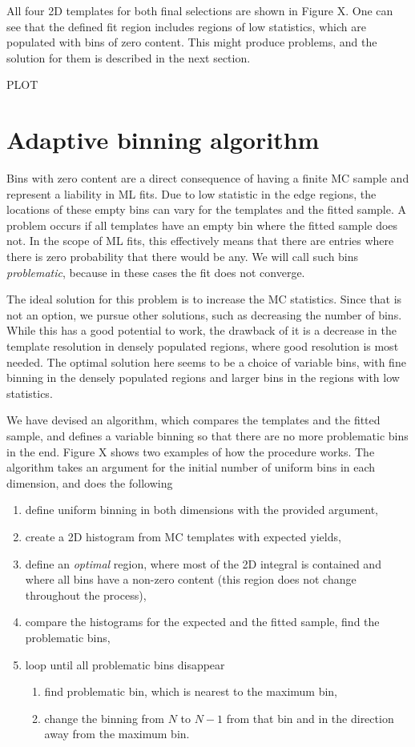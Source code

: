 \documentclass[oneside,a4paper,openany,12pt]{scrbook}
\begin{document}
All four 2D templates for both final selections are shown in Figure X. One can see that the defined fit region includes regions of low statistics, which are populated with bins of zero content. This might produce problems, and the solution for them is described in the next section.


PLOT

\section{Adaptive binning algorithm}

Bins with zero content are a direct consequence of having a finite MC sample and represent a liability in ML fits. Due to low statistic in the edge regions, the locations of these empty bins can vary for the templates and the fitted sample. A problem occurs if all templates have an empty bin where the fitted sample does not. In the scope of ML fits, this effectively means that there are entries where there is zero probability that there would be any. We will call such bins \textit{problematic}, because in these cases the fit does not converge.

The ideal solution for this problem is to increase the MC statistics. Since that is not an option, we pursue other solutions, such as decreasing the number of bins. While this has a good potential to work, the drawback of it is a decrease in the template resolution in densely populated regions, where good resolution is most needed. The optimal solution here seems to be a choice of variable bins, with fine binning in the densely populated regions and larger bins in the regions with low statistics.

We have devised an algorithm, which compares the templates and the fitted sample, and defines a variable binning so that there are no more problematic bins in the end. Figure X shows two examples of how the procedure works. The algorithm takes an argument for the initial number of uniform bins in each dimension, and does the following
\begin{enumerate}
\item define uniform binning in both dimensions with the provided argument,
\item create a 2D histogram from MC templates with expected yields,
\item define an \textit{optimal} region, where most of the 2D integral is contained and where all bins have a non-zero content (this region does not change throughout the process),
\item compare the histograms for the expected and the fitted sample, find the problematic bins,
\item loop until all problematic bins disappear
	\begin{enumerate}
	\item find problematic bin, which is nearest to the maximum bin,
	\item change the binning from $N$ to $N-1$ from that bin and in the direction away from the maximum bin.
	\end{enumerate}
\end{enumerate}
\end{document}
